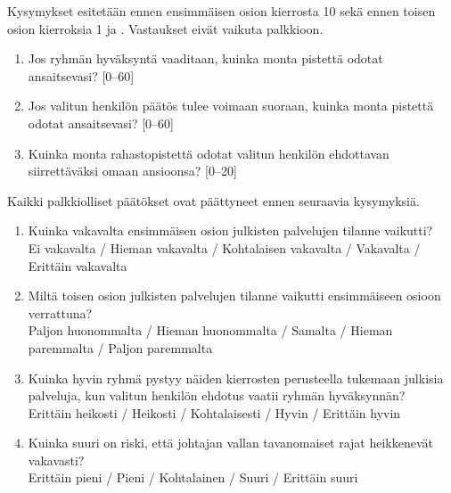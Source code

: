 Kysymykset esitetään ennen ensimmäisen osion kierrosta 10 sekä ennen toisen osion kierroksia 1 ja . Vastaukset eivät vaikuta palkkioon.
\begin{enumerate}
  \item Jos ryhmän hyväksyntä vaaditaan, kuinka monta pistettä odotat ansaitsevasi? [0--60]
  \item Jos valitun henkilön päätös tulee voimaan suoraan, kuinka monta pistettä odotat ansaitsevasi? [0--60]
  \item Kuinka monta rahastopistettä odotat valitun henkilön ehdottavan siirrettäväksi omaan ansioonsa? [0--20]
\end{enumerate}

Kaikki palkkiolliset päätökset ovat päättyneet ennen seuraavia kysymyksiä.
\begin{enumerate}
  \item Kuinka vakavalta ensimmäisen osion julkisten palvelujen tilanne vaikutti?\\ Ei vakavalta / Hieman vakavalta / Kohtalaisen vakavalta / Vakavalta / Erittäin vakavalta
  \item Miltä toisen osion julkisten palvelujen tilanne vaikutti ensimmäiseen osioon verrattuna?\\ Paljon huonommalta / Hieman huonommalta / Samalta / Hieman paremmalta / Paljon paremmalta
  \item Kuinka hyvin ryhmä pystyy näiden kierrosten perusteella tukemaan julkisia palveluja, kun valitun henkilön ehdotus vaatii ryhmän hyväksynnän?\\ Erittäin heikosti / Heikosti / Kohtalaisesti / Hyvin / Erittäin hyvin
  \item Kuinka suuri on riski, että johtajan vallan tavanomaiset rajat heikkenevät vakavasti?\\ Erittäin pieni / Pieni / Kohtalainen / Suuri / Erittäin suuri
\end{enumerate}

